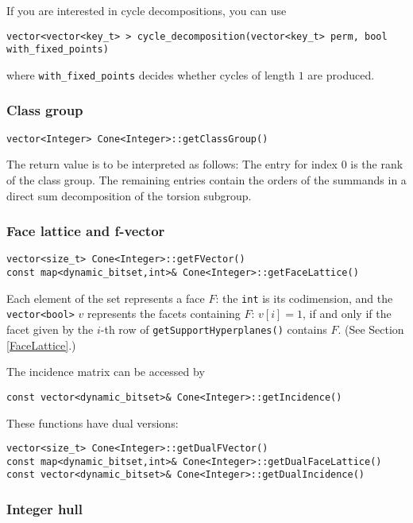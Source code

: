 \documentclass[12pt,a4paper]{scrartcl}
\theoremstyle{definition}
\begin{document}
\begin{small}
If you are interested in cycle decompositions, you can use
\begin{Verbatim}
vector<vector<key_t> > cycle_decomposition(vector<key_t> perm, bool with_fixed_points)
\end{Verbatim}
where \verb|with_fixed_points| decides whether cycles of length $1$ are produced.

\subsubsection{Class group}

\begin{Verbatim}
vector<Integer> Cone<Integer>::getClassGroup()
\end{Verbatim}
The return value is to be interpreted as follows: The entry for index $0$ is the rank of the class group. The remaining entries contain the orders of the summands in a direct sum decomposition of the torsion subgroup.

\subsubsection{Face lattice and f-vector}
\begin{Verbatim}
vector<size_t> Cone<Integer>::getFVector()
const map<dynamic_bitset,int>& Cone<Integer>::getFaceLattice()
\end{Verbatim}
Each element of the set represents a face $F$: the \verb|int| is its codimension, and the \verb|vector<bool>| $v$ represents the facets containing $F$: $v[i]=1$, if and only if the  facet given by the $i$-th row of \verb|getSupportHyperplanes()| contains $F$. (See Section \ref{FaceLattice}.)

The incidence matrix can be accessed by

\begin{Verbatim}
const vector<dynamic_bitset>& Cone<Integer>::getIncidence()
\end{Verbatim}

These functions have dual versions:

\begin{Verbatim}
vector<size_t> Cone<Integer>::getDualFVector()
const map<dynamic_bitset,int>& Cone<Integer>::getDualFaceLattice()
const vector<dynamic_bitset>& Cone<Integer>::getDualIncidence()
\end{Verbatim}

\subsubsection{Integer hull}


\end{small}
\end{document}
